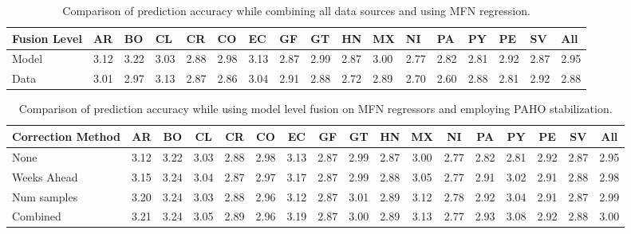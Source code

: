 \begin{table*}[tb!]
  \scriptsize
  \centering
\captionsetup{font=scriptsize}
  \caption{\label{tb:comparison_ensemble}Comparison of prediction accuracy while combining all data sources
  and using MFN regression.}
\vspace{-1em}
  \begin{tabular}{|p{1.5cm}|*{16}{l|}}
\hline
Fusion Level& AR & BO & CL & CR & CO & EC & GF & GT & HN & MX & NI & PA & PY & PE & SV & All\\
\hline \hline
Model       &3.12&3.22&3.03&2.88&2.98&3.13&2.87&2.99&2.87&3.00&2.77&2.82&2.81&2.92&2.87&2.95\\ 
Data        &3.01&2.97&3.13&2.87&2.86&3.04&2.91&2.88&2.72&2.89&2.70&2.60&2.88&2.81&2.92&2.88\\ 
\hline
\end{tabular}
\vspace{-1em}
\end{table*}
\begin{table*}[tb!]
  \scriptsize
  \centering
\captionsetup{font=scriptsize}
  \caption{\label{tb:moving} Comparison of prediction accuracy while using model level fusion 
  on MFN regressors and employing PAHO stabilization.}
\vspace{-1em}
\begin{tabular}{|p{1.5cm}|*{16}{c|}}
\hline
Correction Method& AR & BO & CL & CR & CO & EC & GF & GT & HN & MX & NI & PA & PY & PE & SV & All\\
\hline \hline
None             &3.12&3.22&3.03&2.88&2.98&3.13&2.87&2.99&2.87&3.00&2.77&2.82&2.81&2.92&2.87&2.95\\ \hline
Weeks Ahead      &3.15&3.24&3.04&2.87&2.97&3.17&2.87&2.99&2.88&3.05&2.77&2.91&3.02&2.91&2.88&2.98\\ \hline 
Num samples      &3.20&3.24&3.03&2.88&2.96&3.12&2.87&3.01&2.89&3.12&2.78&2.92&3.04&2.91&2.87&2.99\\ \hline
Combined         &3.21&3.24&3.05&2.89&2.96&3.19&2.87&3.00&2.89&3.13&2.77&2.93&3.08&2.92&2.88&3.00\\ 
\hline
\end{tabular}
\vspace{-1em}
\end{table*}

